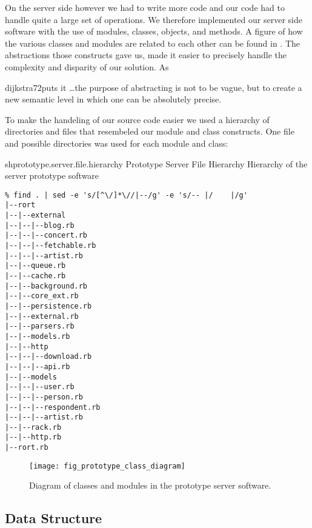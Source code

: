On the server side however we had to write more code and our code had to
handle quite a large set of operations. We therefore implemented our server
side software with the use of modules, classes, objects, and methods.
A figure of how the various classes and modules are related to each other
can be found in .
The abstractions those constructs gave us, made it easier to
precisely handle the complexity and disparity of our solution. 
As
\begin{fullquote}[\p{864}]{dijkstra72}{puts it}
  \ldots the purpose of abstracting is not to be vague, but to create a new
  semantic level in which one can be absolutely precise.
\end{fullquote}

To make the handeling of our source code easier we used a hierarchy of
directories and files that resembeled our module and class constructs. One
file and possible directories was used for each module and class:

\begin{scode}{sh}{prototype.server.file.hierarchy}{%
  Prototype Server File Hierarchy}{%
  Hierarchy of the server prototype software}
\begin{lstlisting}
% find . | sed -e 's/[^\/]*\//|--/g' -e 's/-- |/    |/g'
|--rort
|--|--external
|--|--|--blog.rb
|--|--|--concert.rb
|--|--|--fetchable.rb
|--|--|--artist.rb
|--|--queue.rb
|--|--cache.rb
|--|--background.rb
|--|--core_ext.rb
|--|--persistence.rb
|--|--external.rb
|--|--parsers.rb
|--|--models.rb
|--|--http
|--|--|--download.rb
|--|--|--api.rb
|--|--models
|--|--|--user.rb
|--|--|--person.rb
|--|--|--respondent.rb
|--|--|--artist.rb
|--|--rack.rb
|--|--http.rb
|--rort.rb
\end{lstlisting}
\end{scode}

\begin{figure}
  \begin{whole}
    \centering
    \texttt{[image: fig\_prototype\_class\_diagram]}
    \caption[Prototype Class Diagram]{
      Diagram of classes and modules in the prototype server software.
    }
    \label{figure:fig.prototype.class.diagram}
  \end{whole}
\end{figure}

\subsection{Data Structure}

